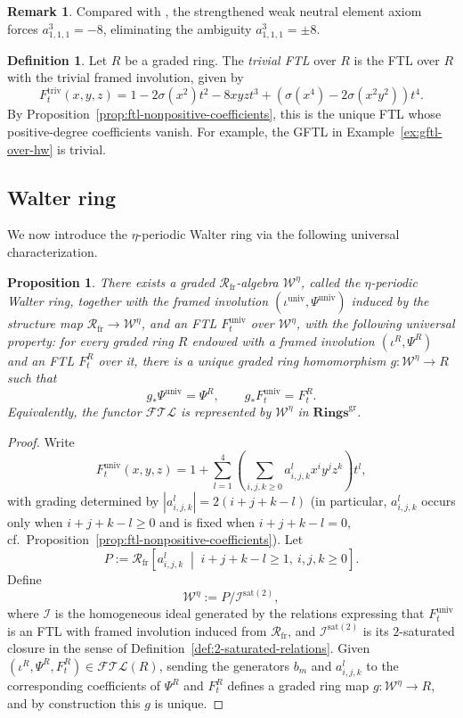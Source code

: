 \documentclass[a4paper]{amsart}
\theoremstyle{plain}
\newtheorem{proposition}[subsubsection]{Proposition}
\theoremstyle{definition}
\newtheorem{definition}[subsubsection]{Definition}
\newtheorem{remark}[subsubsection]{Remark}
\newcommand{\W}{\mathcal{W}^{\eta}}
\newcommand{\univ}{\mathrm{univ}}
\newcommand{\Rfr}{\mathcal{R}_{\mathrm{fr}}}
\renewcommand{\ge}{\geqslant}
\begin{document}
\begin{remark}
	Compared with \cite[\S A.5]{coulette2024formal}, the strengthened weak neutral element axiom forces $a^3_{1,1,1}=-8$, eliminating the ambiguity $a^3_{1,1,1}=\pm 8$.
\end{remark}

\begin{definition}\label{def:trivial-ftl}
	Let $R$ be a graded ring. The \emph{trivial FTL} over $R$ is the FTL over $R$ with the trivial framed involution, given by
	\[
		F_t^{\mathrm{triv}}(x,y,z)=1-2\sigma(x^2)t^2-8xyz t^3+\left(\sigma(x^4)-2\sigma(x^2y^2)\right)t^4.
	\]
	By Proposition~\ref{prop:ftl-nonpositive-coefficients}, this is the unique FTL whose positive-degree coefficients vanish. For example, the GFTL in Example~\ref{ex:gftl-over-hw} is trivial.
\end{definition}

\subsection{Walter ring}\label{subsec:walter-ring}
We now introduce the $\eta$-periodic Walter ring via the following universal characterization.

\begin{proposition}
	There exists a graded $\Rfr$-algebra $\W$, called the \emph{$\eta$-periodic Walter ring}, together with the framed involution $(\iota^{\univ}, \Psi^{\univ})$ induced by the structure map $\Rfr\to\W$, and an FTL $F_t^{\univ}$ over $\W$, with the following universal property: for every graded ring $R$ endowed with a framed involution $(\iota^R, \Psi^R)$ and an FTL $F_t^R$ over it, there is a unique graded ring homomorphism $g:\W\to R$ such that
	\[
		g_*\Psi^{\univ}=\Psi^R,\qquad g_*F_t^{\univ}=F_t^R.
	\]
	Equivalently, the functor $\mathcal{FTL}$ is represented by $\W$ in $\mathbf{Rings}^{\mathrm{gr}}$.
\end{proposition}

\begin{proof}
	Write
	\[
		F_t^{\univ}(x,y,z)=1 + \sum_{l=1}^{4}\left(\sum_{i,j,k\ge 0} a^l_{i,j,k} x^i y^j z^k\right)t^l,
	\]
	with grading determined by $|a^l_{i,j,k}|=2(i+j+k-l)$ (in particular, $a^l_{i,j,k}$ occurs only when $i+j+k-l\ge 0$ and is fixed when $i+j+k-l = 0$, cf.~Proposition~\ref{prop:ftl-nonpositive-coefficients}). Let
	\[
		P:=\Rfr\left[ a^l_{i,j,k} \;\middle|\; i+j+k-l\ge 1,\ i,j,k\ge 0 \right].
	\]
	Define
	\[
		\W:=P/\mathcal{I}^{\mathrm{sat}(2)},
	\]
	where $\mathcal{I}$ is the homogeneous ideal generated by the relations expressing that $F_t^{\univ}$ is an FTL with framed involution induced from $\Rfr$, and $\mathcal{I}^{\mathrm{sat}(2)}$ is its $2$-saturated closure in the sense of Definition~\ref{def:2-saturated-relations}.
	Given $(\iota^R, \Psi^R, F_t^R)\in \mathcal{FTL}(R)$, sending the generators $b_m$ and $a^l_{i,j,k}$ to the corresponding coefficients of $\Psi^R$ and $F_t^R$ defines a graded ring map $g:\W\to R$, and by construction this $g$ is unique.
\end{proof}
\end{document}
